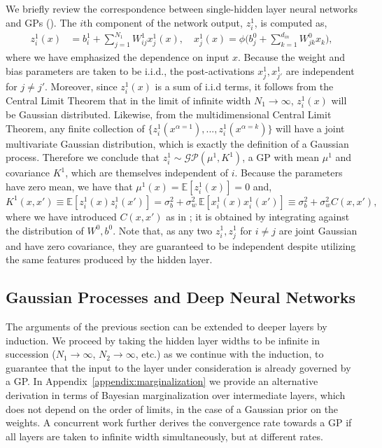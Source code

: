 \documentclass{article} %
\begin{document}
We briefly review the correspondence between single-hidden layer neural networks and GPs (\cite{neal, nealthesis, williams1997}). The $i$th component of the network output, $z^1_i$, is computed as,
\begin{align}
z^{1}_{i}(x) &= b^1_i + \sum_{j=1}^{N_1} W^{1}_{ij} x^1_j(x), \quad x^1_j(x) = \phi\bigg( b^0_j + \sum_{k=1}^{d_{in}} W^0_{jk} x_{k} \bigg),
\label{eq:singlelayer}
\end{align}
where we have emphasized the dependence on input $x$.
Because the weight and bias parameters are taken to be i.i.d., the post-activations $x^1_j, x^1_{j'}$ are independent for $j \neq j'$. Moreover, since $z^1_i(x)$ is a sum of i.i.d terms, it follows from the Central Limit Theorem that in the limit of infinite width $N_1 \rightarrow \infty$, $z^1_i(x)$ will be Gaussian distributed. Likewise, from the multidimensional Central Limit Theorem, any finite collection of $\{z^1_{i}(x^{\alpha=1}), ..., z^{1}_{i}(x^{\alpha=k})\}$ will have a joint multivariate Gaussian distribution, which is exactly the definition of a Gaussian process. Therefore we conclude that $z^1_i \sim \mathcal{GP}(\mu^1, K^1)$, a GP with mean $\mu^1$ and covariance $K^1$, which are themselves independent of $i$. Because the parameters have zero mean, we have that $\mu^1(x) = \mathbb{E} \left[z^1_i(x) \right] = 0$ and,
\begin{equation}
K^1(x, x') \equiv \mathbb{E}\left[z^1_i(x) z^1_i(x')\right] = \sigma^2_{b} + \sigma^{2}_{w} \, \mathbb{E} \left[ x^1_i(x) x^1_i(x') \right] \equiv \sigma^2_b + \sigma^2_w C(x,x'),
\label{eq:F_func}
\end{equation}
where we have introduced $C(x,x')$ as in \cite{neal}; it is obtained by integrating against the distribution of $W^0, b^0$. Note that, as any two $z^1_i, z^1_j$ for $i \neq j$ are joint Gaussian and have zero covariance, they are guaranteed to be independent despite utilizing the same features produced by the hidden layer.

\subsection{Gaussian Processes and Deep Neural Networks}
\label{sec:deepKernel}

The arguments of the previous section can be extended to deeper layers by induction. We proceed by taking the hidden layer widths to be infinite in succession ($N_1 \rightarrow \infty$, $N_2 \rightarrow \infty$, etc.) as we continue with the induction, to guarantee that the input to the layer under consideration is already governed by a GP. In Appendix~\ref{appendix:marginalization} we provide an alternative derivation in terms of Bayesian marginalization over intermediate layers, which does not depend on the order of limits, in the case of a Gaussian prior on the weights. A concurrent work \citep{matthews2018} further derives the convergence rate towards a GP if all layers are taken to infinite width simultaneously, but at different rates.
\end{document}
